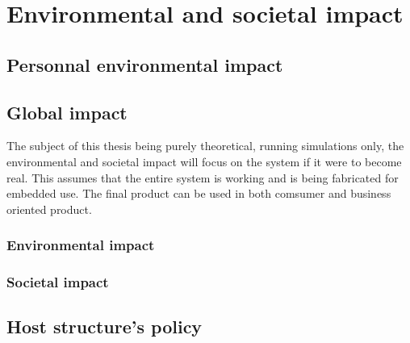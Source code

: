 \section{Environmental and societal impact}

\subsection{Personnal environmental impact}

\subsection{Global impact}

The subject of this thesis being purely theoretical, running simulations only, the environmental and societal impact will focus on the system if it were to become real. This assumes that the entire system is working and is being fabricated for embedded use. The final product can be used in both comsumer and business oriented product.

\subsubsection{Environmental impact}

\subsubsection{Societal impact}

\subsection{Host structure's policy}
